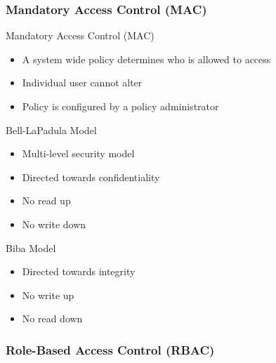 \subsubsection{Mandatory Access Control (MAC)}

\begin{definition}{Mandatory Access Control (MAC)}\\
    \begin{itemize}
        \item A system wide policy determines who is allowed to access
        \item Individual user cannot alter
        \item Policy is configured by a policy administrator
    \end{itemize}
    
\end{definition}

\begin{concept}{Bell-LaPadula Model}\\
    \begin{itemize}
        \item Multi-level security model
        \item Directed towards confidentiality
        \item No read up
        \item No write down
    \end{itemize}
\end{concept}

\begin{concept}{Biba Model}\\
    \begin{itemize}
        \item Directed towards integrity
        \item No write up
        \item No read down
    \end{itemize}
\end{concept}

\subsubsection{Role-Based Access Control (RBAC)}

